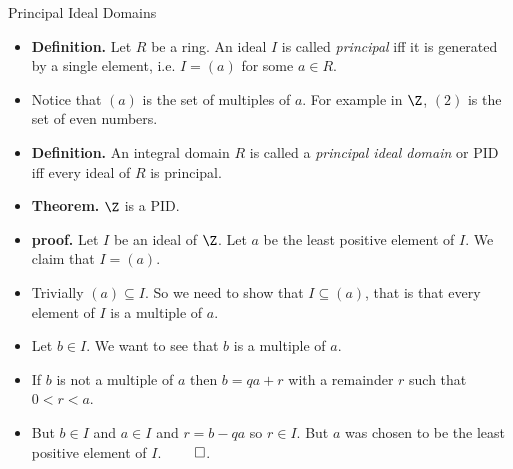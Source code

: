 \documentclass[handout]{beamer}
\begin{document}

\begin{frame}{Principal Ideal Domains}

\begin{itemize}
  \item \textbf{Definition.} Let $R$ be a ring. An ideal $I$ is called \emph{principal} iff it is generated by a single element, i.e.
  $I=(a)$ for some $a\in R$.
  \item Notice that $(a)$ is the set of multiples of $a$. For example in $\Z$, $(2)$ is the set of even numbers.
  \item \textbf{Definition.} An integral domain $R$ is called a \emph{principal ideal domain} or PID iff every ideal of $R$ is principal.
  \item \textbf{Theorem.} $\Z$ is a PID.
  \item \textbf{proof.} Let $I$ be an ideal of $\Z$. Let $a$ be the least positive element of $I$. We claim that $I=(a)$.
  \item Trivially $(a) \subseteq I$. So we need to show that $I \subseteq (a)$, that is that every element of $I$ is a multiple of $a$.
  \item Let $b\in I$. We want to see that $b$ is a multiple of $a$.
  \item If $b$ is not a multiple of $a$ then $b=qa+r$ with a remainder $r$ such that $0<r <a$.
  \item But $b\in I$ and $a\in I$ and $r = b -qa$ so $r\in I$. But $a$ was chosen to be the least positive element of $I$. $\qed$.
\end{itemize}

\end{frame}


\end{document}

